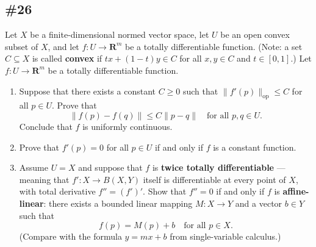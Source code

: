 \documentclass{article}
\newcommand{\R}{\mathbf{R}}
\theoremstyle{plain} %
\numberwithin{thm}{section} %
\theoremstyle{definition}
\begin{document}
        \subsection{\#26}

        Let $X$ be a finite-dimensional normed vector space, let $U$ be an open convex subset of $X$, and let $f:U\rightarrow \R^m$ be a totally differentiable function. (Note: a set $C\subseteq X$ is called \textbf{convex} if $tx+(1-t)y\in C$ for all $x,y\in C$ and $t\in [0,1]$.) Let $f:U\rightarrow \R^m$ be a totally differentiable function.

        \begin{enumerate}[label=(\alph*)]
            \item Suppose that there exists a constant $C\geq 0$ such that $\|f'(p)\|_{\mathrm{op}}\leq C$ for all $p\in U$. Prove that
                \[ \|f(p)-f(q)\| \leq C\|p-q\| \quad \text{for all $p,q\in U$.}  \]
            Conclude that $f$ is uniformly continuous.
            
            \item Prove that $f'(p)=0$ for all $p\in U$ if and only if $f$ is a constant function.

            \item Assume $U=X$ and suppose that $f$ is \textbf{twice totally differentiable} --- meaning that $f':X\rightarrow B(X,Y)$ itself is differentiable at every point of $X$, with total derivative $f''=(f')'$. Show that $f''=0$ if and only if $f$ is \textbf{affine-linear}: there exists a bounded linear mapping $M:X\rightarrow Y$ and a vector $b\in Y$ such that
                \[ f(p) = M(p) + b \quad \text{for all $p\in X$.} \]
            (Compare with the formula $y=mx+b$ from single-variable calculus.)
        \end{enumerate}
\end{document}
